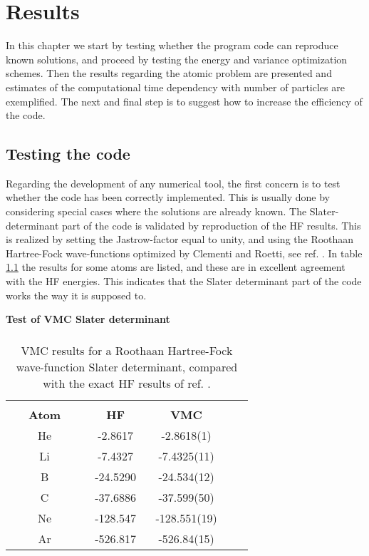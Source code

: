 \chapter{Results}
\label{Results}

In this chapter we start by testing whether the program code can
reproduce known solutions, and proceed by testing the energy
and variance optimization schemes. Then the results regarding the
atomic problem are presented and estimates of the computational time
dependency with number of particles are exemplified. The next and
final step is to suggest how to increase the efficiency of the code.

%
%
\section{Testing the code}
\label{TestingTheCode}

Regarding the development of any numerical tool, the first concern is
to test whether the code has been correctly implemented. This
is usually done by considering special cases where the solutions are
already known. 
\newline
%
\newline
The Slater-determinant part of the code is validated by reproduction
of the HF results. This is realized by setting the Jastrow-factor
equal to unity, and using the Roothaan Hartree-Fock wave-functions
optimized by Clementi and Roetti, see ref. \cite{clementi1974}. In table
\ref{HFfNone} the results for some atoms are listed, and these
are in excellent agreement with the HF energies. This indicates that
the Slater determinant part of the code works the way it is supposed
to.
\newline

\begin{table}[hbtp]
\begin{center} {\large \bf Test of VMC Slater determinant} \\ 
$\phantom{a}$ \\
\begin{tabular}{ccccc}
\hline\\ 
$\phantom{AA}${\bf Atom}$\phantom{AA}$ & $\phantom{AA}${\bf HF}$\phantom{AA}$     & $\phantom{AA}${\bf VMC}$\phantom{AA}$    \\
He         &   -2.8617    & -2.8618(1)   \\
Li         &   -7.4327    & -7.4325(11)  \\   
B          &  -24.5290    & -24.534(12)  \\   
C          &  -37.6886    & -37.599(50)  \\   
Ne         &  -128.547    & -128.551(19) \\   
Ar         &  -526.817    & -526.84(15)  \\  [10pt]
\hline
\end{tabular} 
\end{center}
\caption{VMC results for a Roothaan Hartree-Fock wave-function Slater
  determinant, compared with the exact HF results of
  ref. \cite{clementi1974}.}
\label{HFfNone}
\end{table}

